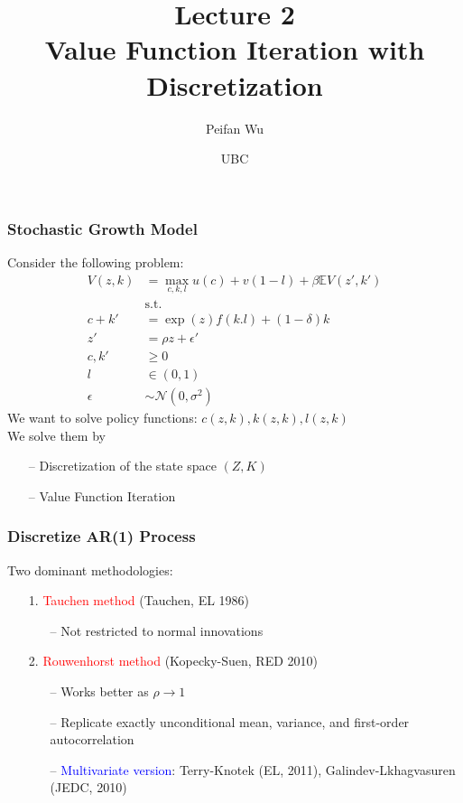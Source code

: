 \documentclass[aspectratio=169, 11pt]{beamer}
\begin{document}
\title{Lecture 2 \\ Value Function Iteration with Discretization}
\author[Wu]{Peifan Wu}
\date{UBC}

\begin{frame}
\titlepage
\end{frame}

\begin{frame}
\frametitle{Stochastic Growth Model}
  Consider the following problem:
  \begin{align*}
    V\left(z,k\right) & =\max_{c,k,l}u\left(c\right)+v\left(1-l\right)+\beta\mathbb{E}V\left(z',k'\right)\\
     & \text{s.t.}\\
    c+k' & =\exp\left(z\right)f\left(k.l\right)+\left(1-\delta\right)k\\
    z' & =\rho z+\epsilon'\\
    c,k' & \geqslant0\\
    l & \in\left(0,1\right)\\
    \epsilon & \sim\mathcal{N}\left(0,\sigma^{2}\right)
  \end{align*}
  We want to solve policy functions: $c\left(z,k\right),k\left(z,k\right),l\left(z,k\right)$ \\
  \medskip
  We solve them by
  \begin{itemize}
    \item[--] Discretization of the state space $\left(Z, K\right)$
    \item[--] Value Function Iteration
  \end{itemize}
\end{frame}

\begin{frame}
\frametitle{Discretize AR(1) Process}
  Two dominant methodologies:
  \bigskip

  \begin{itemize}
    \item[1.] \textcolor{red}{Tauchen method} (Tauchen, EL 1986)
    \begin{itemize}
      \item[--] Not restricted to normal innovations
    \end{itemize}
    \bigskip
    \item[2.] \textcolor{red}{Rouwenhorst method} (Kopecky-Suen, RED 2010)
    \begin{itemize}
      \item[--] Works better as $\rho\to1$
      \item[--] Replicate exactly unconditional mean, variance, and first-order autocorrelation
      \item[--] \textcolor{blue}{Multivariate version}: Terry-Knotek (EL, 2011), Galindev-Lkhagvasuren (JEDC, 2010)
    \end{itemize}
  \end{itemize}
\end{frame}
\end{document}
